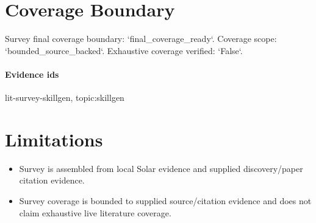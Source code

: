 \documentclass{article}
\begin{document}
\section{Coverage Boundary}
Survey final coverage boundary: `final\_coverage\_ready`. Coverage scope: `bounded\_source\_backed`. Exhaustive coverage verified: `False`.

\paragraph{Evidence ids} lit-survey-skillgen, topic:skillgen

\section{Limitations}

\begin{itemize}\item Survey is assembled from local Solar evidence and supplied discovery/paper citation evidence.\end{itemize}
\begin{itemize}\item Survey coverage is bounded to supplied source/citation evidence and does not claim exhaustive live literature coverage.\end{itemize}
\end{document}

